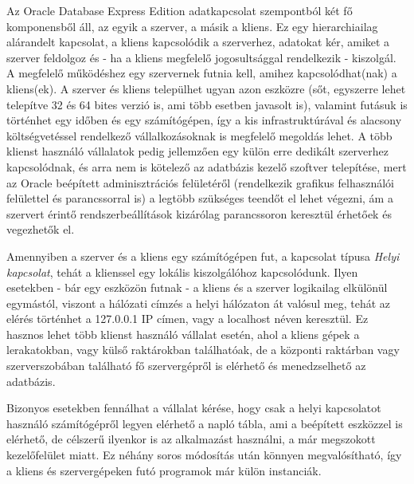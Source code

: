 


\setlength{\parindent}{12.5mm}Az Oracle Database Express Edition adatkapcsolat szempontból két fő komponensből áll, az egyik a szerver, a másik a kliens. Ez egy hierarchiailag alárandelt kapcsolat, a kliens kapcsolódik a szerverhez, adatokat kér, amiket a szerver feldolgoz és - ha a kliens megfelelő jogosultsággal rendelkezik - kiszolgál. A megfelelő működéshez egy szervernek futnia kell, amihez kapcsolódhat(nak) a kliens(ek). A szerver és kliens települhet ugyan azon eszközre (sőt, egyszerre lehet telepítve 32 és 64 bites verzió is, ami több esetben javasolt is), valamint futásuk is történhet egy időben és egy számítógépen, így a kis infrastruktúrával és alacsony költségvetéssel rendelkező vállalkozásoknak is megfelelő megoldás lehet. A több klienst használó vállalatok pedig jellemzően egy külön erre dedikált szerverhez kapcsolódnak, és arra nem is kötelező az adatbázis kezelő szoftver telepítése, mert az Oracle beépített adminisztrációs felületéről (rendelkezik grafikus felhasználói felülettel és parancssorral is) a legtöbb szükséges teendőt el lehet végezni, ám a szervert érintő rendszerbeállítások kizárólag parancssoron keresztül érhetőek és vegezhetők el.


	\label{helyi_kapcsolat}

Amennyiben a szerver és a kliens egy számítógépen fut, a kapcsolat típusa \textit{Helyi kapcsolat}, tehát a klienssel egy lokális kiszolgálóhoz kapcsolódunk. Ilyen esetekben - bár egy eszközön futnak - a kliens és a szerver logikailag elkülönül egymástól, viszont a hálózati címzés a helyi hálózaton át valósul meg, tehát az elérés történhet a 127.0.0.1 IP címen, vagy a localhost néven keresztül. Ez hasznos lehet több klienst használó vállalat esetén, ahol a kliens gépek a lerakatokban, vagy külső raktárokban találhatóak, de a központi raktárban vagy szerverszobában található fő szervergépről is elérhető és menedzselhető az adatbázis.\par
\setlength{\parindent}{12.5mm}Bizonyos esetekben fennálhat a vállalat kérése, hogy csak a helyi kapcsolatot használó számítógépről legyen elérhető a napló tábla, ami a beépített eszközzel is elérhető, de célszerű ilyenkor is az alkalmazást használni, a már megszokott kezelőfelület miatt. Ez néhány soros módosítás után könnyen megvalósítható, így a kliens és szervergépeken futó programok már külön instanciák.

